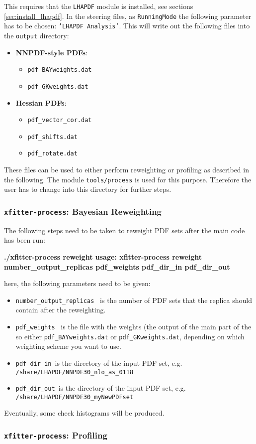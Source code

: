 This requires that the {\tt LHAPDF} module is installed, see sections \ref{sec:install_lhapdf}. In the \fitter steering files, as {\tt RunningMode} the following parameter has to be chosen: {\tt 'LHAPDF Analysis'}. This will write out the following files into the {\tt output} directory:

\begin{itemize}
 \item \textbf{NNPDF-style PDFs}:
 \begin{itemize}
  \item {\tt pdf\_BAYweights.dat}
  \item {\tt pdf\_GKweights.dat}
 \end{itemize}
  \item \textbf{Hessian PDFs}:
 \begin{itemize}
   \item {\tt{pdf\_vector\_cor.dat}}
   \item {\tt{pdf\_shifts.dat}}
   \item {\tt{pdf\_rotate.dat}}  
\end{itemize}
\end{itemize}


These files can be used to either perform reweighting or profiling as described in the following. The module {\tt tools/process} is used for this purpose. Therefore the user has to change into this directory for further steps. 

\subsubsection{{\tt xfitter-process}: Bayesian Reweighting}

The following steps need to be taken to reweight PDF sets after the main code has been run:

\textbf{./xfitter-process reweight
usage: xfitter-process reweight number\_output\_replicas pdf\_weights pdf\_dir\_in pdf\_dir\_out}

here, the following parameters need to be given:
\begin{itemize}
\item {\tt number\_output\_replicas } is the number of PDF sets that the replica should contain after the reweighting. 
\item {\tt pdf\_weights  } is the file with the weights (the output of the main part of the \fitter so either {\tt pdf\_BAYweights.dat} or {\tt pdf\_GKweights.dat}, depending on which weighting scheme you want to use.
\item {\tt pdf\_dir\_in }is the directory of the input PDF set, e.g. {\tt /share/LHAPDF/NNPDF30\_nlo\_as\_0118}
\item {\tt pdf\_dir\_out }is the directory of the input PDF set, e.g. {\tt /share/LHAPDF/NNPDF30\_myNewPDFset}
\end{itemize}

Eventually, some check histograms will be produced.

\subsubsection{{\tt xfitter-process}: Profiling}


